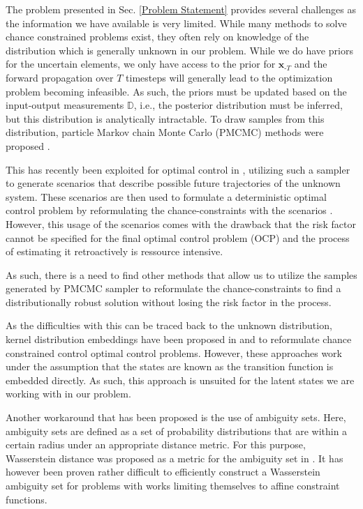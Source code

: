 The problem presented in Sec. \ref{Problem Statement} provides several challenges as the information we have available is very limited. While many methods to solve chance constrained problems exist, they often rely on knowledge of the distribution which is generally unknown in our problem. While we do have priors for the uncertain elements, we only have access to the prior for $\boldsymbol{x}_{\text{-}T}$ and the forward propagation over $T$ timesteps will generally lead to the optimization problem becoming infeasible. As such, the priors must be updated based on the input-output measurements $\mathbb{D}$, i.e., the posterior distribution must be inferred, but this distribution is analytically intractable. To draw samples from this distribution, particle Markov chain Monte Carlo (PMCMC) methods were proposed \cite{Andrieu_10}. 

This has recently been exploited for optimal control in \cite{Robert_24}, utilizing such a sampler to generate scenarios that describe possible future trajectories of the unknown system. These scenarios are then used to formulate a deterministic optimal control problem by reformulating the chance-constraints with the scenarios \cite{Garatti_22}. However, this usage of the scenarios comes with the drawback that the risk factor cannot be specified for the final optimal control problem (OCP) and the process of estimating it retroactively is ressource intensive.

As such, there is a need to find other methods that allow us to utilize the samples generated by PMCMC sampler to reformulate the chance-constraints to find a distributionally robust solution without losing the risk factor in the process. 

As the difficulties with this can be traced back to the unknown distribution, kernel distribution embeddings have been proposed in \cite{Adam_21} and \cite{Adam_22} to reformulate chance constrained control optimal control problems. However, these approaches work under the assumption that the states are known as the transition function is embedded directly. As such, this approach is unsuited for the latent states we are working with in our problem.

Another workaround that has been proposed is the use of ambiguity sets. Here, ambiguity sets are defined as a set of probability distributions that are within a certain radius under an appropriate distance metric. For this purpose, Wasserstein distance was proposed as a metric for the ambiguity set in \cite{Hota_19}. It has however been proven rather difficult to efficiently construct a Wasserstein ambiguity set for problems with works limiting themselves to affine constraint functions. 

